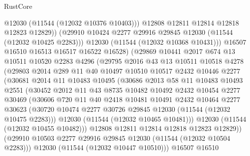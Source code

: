 \begin{lexlean}{RustCore}
\begin{coremodule}
                    @12030
                    (@11544 (@12032 @10376 @10403)))
                  @12808
                  @12811
                  @12814
                  @12818
                  @12823
                  @12829))
              (@29910 @10424 @2277 @29916 @29845 @12030 (@11544 (@12032 @10425 @2283)))
              @12030
              (@11544 (@12032 @10368 @10431)))
            @16507
            @16510
            @16513
            @16517
            @16522
            @16528)
          (@29869
            @10441
            @2017
            @674
            @13
            @10511
            @10520
            @2283
            @4296
            (@29795
              @2016
              @43
              @13
              @10511
              @10518
              @4278
              (@29803
                @2014
                @289
                @11
                @40
                @10497
                @10510
                @10517
                @2432
                @10446
                @2277
                (@30681
                  @2014
                  @11
                  @10483
                  @10495
                  (@30686
                    @2013
                    @58
                    @11
                    @10483
                    @10493
                    @2551
                    (@30452
                      @2012
                      @11
                      @43
                      @8735
                      @10482
                      @10492
                      @2432
                      @10454
                      @2277
                      @30469
                      (@30606
                        @720
                        @11
                        @40
                        @2418
                        @10481
                        @10491
                        @2432
                        @10464
                        @2277
                        @30623
                        (@30720 @10474 @2277 @30726 @29845 @12030 (@11544 (@12032 @10475 @2283)))
                        @12030
                        (@11544 (@12032 @10465 @10481)))
                      @12030
                      (@11544 (@12032 @10455 @10482)))
                    @12808
                    @12811
                    @12814
                    @12818
                    @12823
                    @12829))
                (@29910 @10503 @2277 @29916 @29845 @12030 (@11544 (@12032 @10504 @2283)))
                @12030
                (@11544 (@12032 @10447 @10510)))
              @16507
              @16510

\end{coremodule}
\end{lexlean}
